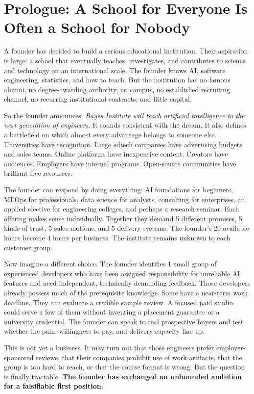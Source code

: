 \section*{Prologue: A School for Everyone Is Often a School for Nobody}

A founder has decided to build a serious educational institution. Their aspiration is large: a school that eventually teaches, investigates, and contributes to science and technology on an international scale. The founder knows AI, software engineering, statistics, and how to teach. But the institution has no famous alumni, no degree-awarding authority, no campus, no established recruiting channel, no recurring institutional contracts, and little capital.

So the founder announces: \emph{Bayes Institute will teach artificial intelligence to the next generation of engineers.} It sounds consistent with the dream. It also defines a battlefield on which almost every advantage belongs to someone else. Universities have recognition. Large edtech companies have advertising budgets and sales teams. Online platforms have inexpensive content. Creators have audiences. Employers have internal programs. Open-source communities have brilliant free resources.

The founder can respond by doing everything: AI foundations for beginners, MLOps for professionals, data science for analysts, consulting for enterprises, an applied elective for engineering colleges, and perhaps a research seminar. Each offering makes sense individually. Together they demand 5 different promises, 5 kinds of trust, 5 sales motions, and 5 delivery systems. The founder's 20 available hours become 4 hours per business. The institute remains unknown to each customer group.

Now imagine a different choice. The founder identifies 1 small group of experienced developers who have been assigned responsibility for unreliable AI features and need independent, technically demanding feedback. Those developers already possess much of the prerequisite knowledge. Some have a near-term work deadline. They can evaluate a credible sample review. A focused paid studio could serve a few of them without inventing a placement guarantee or a university credential. The founder can speak to real prospective buyers and test whether the pain, willingness to pay, and delivery capacity line up.

This is not yet a business. It may turn out that those engineers prefer employer-sponsored reviews, that their companies prohibit use of work artifacts, that the group is too hard to reach, or that the course format is wrong. But the question is finally tractable. \textbf{The founder has exchanged an unbounded ambition for a falsifiable first position.}

